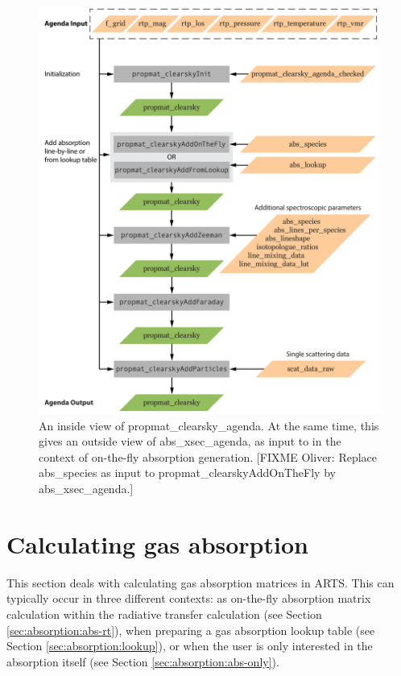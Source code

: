 \begin{figure}
 \begin{center}
  \includegraphics[scale=0.7]{propmat_clearsky_agenda_detail}
  \caption{An inside view of propmat\_clearsky\_agenda. At the same
    time, this gives an outside view of abs\_xsec\_agenda, as input to
     in the context of
    on-the-fly absorption generation. [FIXME Oliver: Replace
    abs\_species as input to propmat\_clearskyAddOnTheFly by abs\_xsec\_agenda.]}
  \label{fig:absorption:pmat_inside}
 \end{center}
\end{figure}



\section{Calculating gas absorption}
\label{sec:absorption:calculating}

This section deals with calculating gas absorption matrices in
ARTS.  This can typically occur in three different contexts:
as on-the-fly absorption matrix calculation within the radiative transfer
calculation (see Section \ref{sec:absorption:abs-rt}), when preparing
a gas absorption lookup table (see Section \ref{sec:absorption:lookup}),
or when the user is only interested in the absorption itself (see Section
\ref{sec:absorption:abs-only}).

